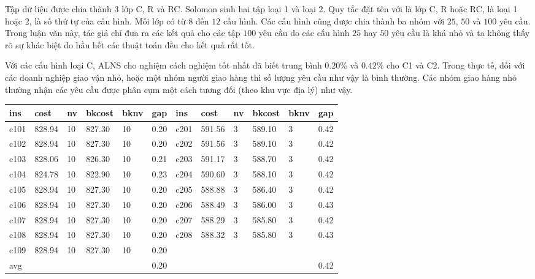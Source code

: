 Tập dữ liệu được chia thành 3 lớp C, R và RC. Solomon sinh hai tập loại 1 và loại 2. Quy tắc đặt tên  với  là lớp C, R hoặc RC,  là loại 1 hoặc 2,  là số thứ tự của cấu hình. Mỗi lớp có từ $8$ đến $12$ cấu hình. Các cấu hình cũng được chia thành ba nhóm với $25$, $50$ và $100$ yêu cầu. Trong luận văn này, tác giả chỉ đưa ra các kết quả cho các tập $100$ yêu cầu do các cấu hình $25$ hay $50$ yêu cầu là khá nhỏ và ta không thấy rõ sự khác biệt do hầu hết các thuật toán đều cho kết quả rất tốt.

Với các cấu hình loại C, ALNS cho nghiệm cách nghiệm tốt nhất đã biết trung bình $0.20\%$ và $0.42\%$ cho C1 và C2. Trong thực tế, đối với các doanh nghiệp giao vận nhỏ, hoặc một nhóm người giao hàng thì số lượng yêu cầu như vậy là bình thường. Các nhóm giao hàng nhỏ thường nhận các yêu cầu được phân cụm một cách tương đối (theo khu vực địa lý) như vậy. 
\begin{table}[caption={Kết quả đo với tập Solomon C}, label=exp:solomonC]
  \begin{adjustbox}{width=1\textwidth}
  \small
  \begin{tabularx}{\textwidth}{|XXXXXX|XXXXXX|}
  \hline
  ins & cost & nv & bkcost & bknv & gap & ins & cost & nv & bkcost & bknv & gap \\ \hline
  c101 & 828.94 & 10 & 827.30 & 10 & 0.20 & c201 & 591.56 & 3 & 589.10 & 3 & 0.42 \\ \hline
  c102 & 828.94 & 10 & 827.30 & 10 & 0.20 & c202 & 591.56 & 3 & 589.10 & 3 & 0.42 \\ \hline
  c103 & 828.06 & 10 & 826.30 & 10 & 0.21 & c203 & 591.17 & 3 & 588.70 & 3 & 0.42 \\ \hline
  c104 & 824.78 & 10 & 822.90 & 10 & 0.23 & c204 & 590.60 & 3 & 588.10 & 3 & 0.42 \\ \hline
  c105 & 828.94 & 10 & 827.30 & 10 & 0.20 & c205 & 588.88 & 3 & 586.40 & 3 & 0.42 \\ \hline
  c106 & 828.94 & 10 & 827.30 & 10 & 0.20 & c206 & 588.49 & 3 & 586.00 & 3 & 0.43 \\ \hline
  c107 & 828.94 & 10 & 827.30 & 10 & 0.20 & c207 & 588.29 & 3 & 585.80 & 3 & 0.42 \\ \hline
  c108 & 828.94 & 10 & 827.30 & 10 & 0.20 & c208 & 588.32 & 3 & 585.80 & 3 & 0.43 \\ \hline
  c109 & 828.94 & 10 & 827.30 & 10 & 0.20 &  &  &  &  &  &  \\ \hline
  avg & & & & & 0.20 &  &  &  &  & & 0.42 \\ \hline
  \end{tabularx}
  \end{adjustbox}
  \end{table}

